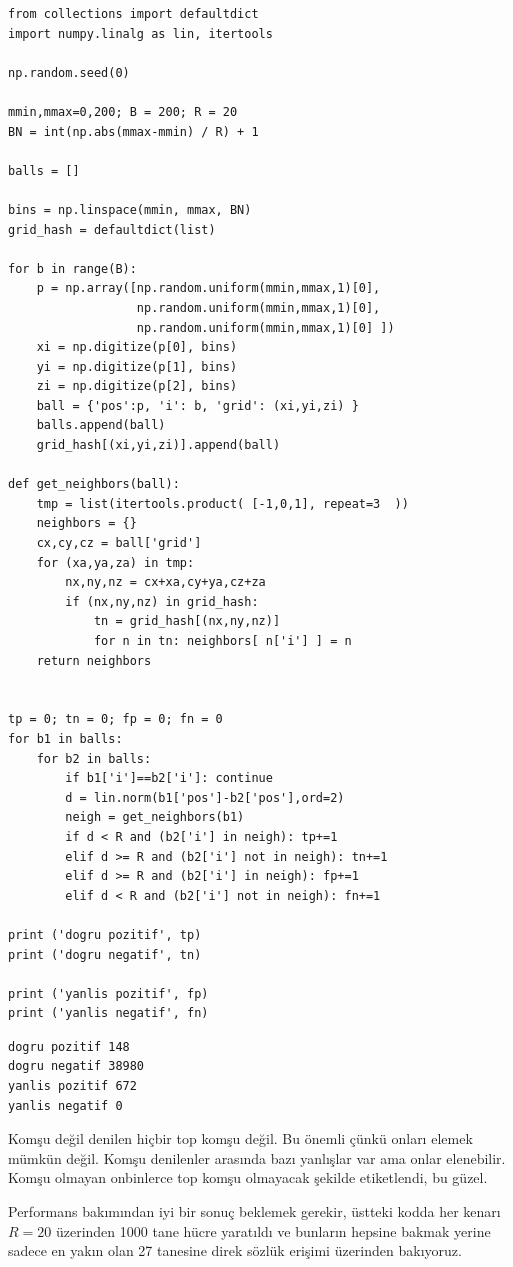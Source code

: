 \documentclass[12pt,fleqn]{article}\usepackage{../../common}
\begin{document}
\begin{verbatim}
from collections import defaultdict 
import numpy.linalg as lin, itertools

np.random.seed(0)

mmin,mmax=0,200; B = 200; R = 20
BN = int(np.abs(mmax-mmin) / R) + 1

balls = []

bins = np.linspace(mmin, mmax, BN)
grid_hash = defaultdict(list)

for b in range(B):
    p = np.array([np.random.uniform(mmin,mmax,1)[0],
                  np.random.uniform(mmin,mmax,1)[0],
                  np.random.uniform(mmin,mmax,1)[0] ])    
    xi = np.digitize(p[0], bins)
    yi = np.digitize(p[1], bins)
    zi = np.digitize(p[2], bins)
    ball = {'pos':p, 'i': b, 'grid': (xi,yi,zi) }
    balls.append(ball)
    grid_hash[(xi,yi,zi)].append(ball)

def get_neighbors(ball):
    tmp = list(itertools.product( [-1,0,1], repeat=3  ))
    neighbors = {}
    cx,cy,cz = ball['grid']
    for (xa,ya,za) in tmp:
        nx,ny,nz = cx+xa,cy+ya,cz+za
        if (nx,ny,nz) in grid_hash:
            tn = grid_hash[(nx,ny,nz)]
            for n in tn: neighbors[ n['i'] ] = n
    return neighbors


tp = 0; tn = 0; fp = 0; fn = 0
for b1 in balls:
    for b2 in balls:
        if b1['i']==b2['i']: continue
        d = lin.norm(b1['pos']-b2['pos'],ord=2)
        neigh = get_neighbors(b1)
        if d < R and (b2['i'] in neigh): tp+=1        
        elif d >= R and (b2['i'] not in neigh): tn+=1
        elif d >= R and (b2['i'] in neigh): fp+=1
        elif d < R and (b2['i'] not in neigh): fn+=1

print ('dogru pozitif', tp)
print ('dogru negatif', tn)

print ('yanlis pozitif', fp)
print ('yanlis negatif', fn)
\end{verbatim}

\begin{verbatim}
dogru pozitif 148
dogru negatif 38980
yanlis pozitif 672
yanlis negatif 0
\end{verbatim}

Komşu değil denilen hiçbir top komşu değil. Bu önemli çünkü onları elemek mümkün
değil. Komşu denilenler arasında bazı yanlışlar var ama onlar elenebilir. Komşu
olmayan onbinlerce top komşu olmayacak şekilde etiketlendi, bu güzel.

Performans bakımından iyi bir sonuç beklemek gerekir, üstteki kodda her kenarı
$R=20$ üzerinden 1000 tane hücre yaratıldı ve bunların hepsine bakmak yerine
sadece en yakın olan 27 tanesine direk sözlük erişimi üzerinden bakıyoruz.
\end{document}
